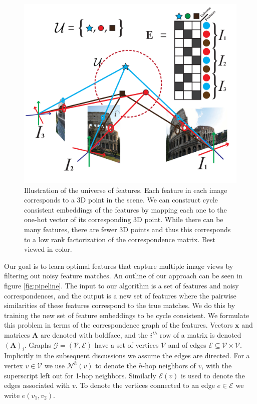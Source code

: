 \documentclass[10pt,twocolumn,letterpaper]{article}
\newcommand{\mat}[1]{\mathbf{#1}}
\begin{document}
\begin{figure}[t]
\begin{center}
  \includegraphics[width=0.9\linewidth]{figures-UniverseOfFeatures-v2.pdf}
\end{center}
  \caption{
    Illustration of the universe of features.
    Each feature in each image corresponds to a 3D point in the scene.
    We can construct cycle consistent embeddings of the features by mapping each one to the one-hot vector of its corresponding 3D point.
    While there can be many features, there are fewer 3D points and thus this corresponds to a low rank factorization of the correspondence matrix.
    Best viewed in color.
  }
\label{fig:universefeatures}
\label{fig:onecol}
\end{figure}
Our goal is to learn optimal features that capture multiple image views by filtering out noisy feature matches.
An outline of our approach can be seen in figure \ref{fig:pipeline}.
The input to our algorithm is a set of features and noisy correspondences, and the output is a new set of features where the pairwise similarities of these features correspond to the true matches.
We do this by training the new set of feature embeddings to be cycle consistent.
We formulate this problem in terms of the correspondence graph of the features.
Vectors $\mat{x}$ and matrices $\mat{A}$ are denoted with boldface, and the $i^{th}$ row of a matrix is denoted $(\mat{A})_i$.
Graphs $\mathcal{G} = (\mathcal{V}, \mathcal{E})$ have a set of vertices $\mathcal{V}$ and of edges $\mathcal{E} \subseteq \mathcal{V} \times \mathcal{V}$.
Implicitly in the subsequent discussions we assume the edges are directed.
For a vertex $v \in \mathcal{V}$ we use $\mathcal{N}^{h}(v)$ to denote the $h$-hop neighbors of $v$, with the superscript left out for 1-hop neighbors.
Similarly $\mathcal{E}(v)$ is used to denote the edges associated with $v$.
To denote the vertices connected to an edge $e \in \mathcal{E}$ we write $e(v_1, v_2)$.
\end{document}
